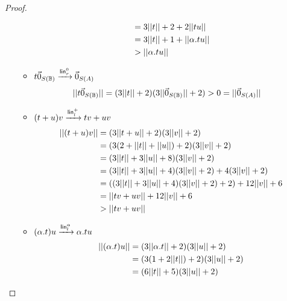 \begin{proof}
\begin{itemize}
\begin{itemize}
\begin{equation*}
\begin{split}
            & = 3 ||t|| + 2 + 2 ||t u|| \\
            & = 3 ||t|| + 1 + ||\alpha . t u|| \\
            & > ||\alpha . t u||
          \end{split}
        \end{equation*}
        \item \( t \vec{0}_{S (\mathbb{B})} \xrightarrow{\mathsf{lin}_r^0} \vec{0}_{S (A)} \)
        \begin{equation*}
          \begin{split}
            ||t \vec{0}_{S (\mathbb{B})}||
            & = (3 ||t|| + 2) (3 ||\vec{0}_{S (\mathbb{B})}|| + 2) > 0 = ||\vec{0}_{S (A)}||
          \end{split}
        \end{equation*}
        \item \( (t + u) v \xrightarrow{\mathsf{lin}_l^+} t v + u v \)
        \begin{equation*}
          \begin{split}
            ||(t + u) v||
            & = (3 ||t + u|| + 2)(3 ||v|| + 2) \\
            & = (3 (2 + ||t|| + ||u||) + 2)(3 ||v|| + 2) \\
            & = (3 ||t|| + 3 ||u|| + 8)(3 ||v|| + 2) \\
            & = (3 ||t|| + 3 ||u|| + 4)(3 ||v|| + 2) + 4 (3 ||v|| + 2) \\
            & = ((3 ||t|| + 3 ||u|| + 4)(3 ||v|| + 2) + 2) + 12 ||v|| + 6 \\
            & = ||t v + u v|| + 12 ||v|| + 6 \\
            & > ||t v + u v||
          \end{split}
        \end{equation*}
        \item \( (\alpha . t) u \xrightarrow{\mathsf{lin}_l^\alpha} \alpha . t u \)
        \begin{equation*}
          \begin{split}
            \size{\app{(\alpha . t)}{u}}
            & = (3 \size{\alpha . t} + 2)(3 \size{u} + 2) \\
            & = (3 (1 + 2 \size{t}) + 2)(3 \size{u} + 2) \\
            & = (6 \size{t} + 5)(3 \size{u} + 2) \\

\end{split}
\end{equation*}
\end{itemize}
\end{itemize}
\end{proof}
